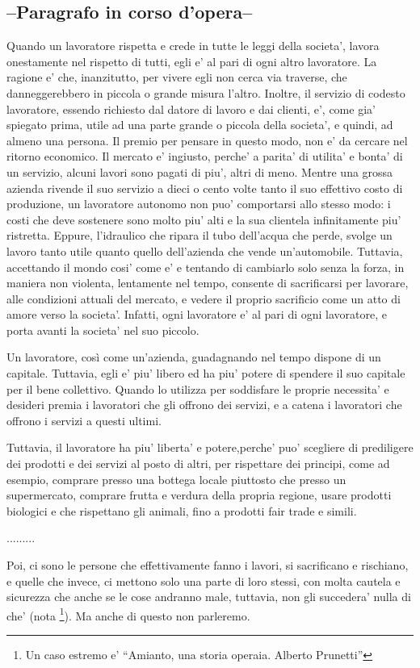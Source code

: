 \subsection{--Paragrafo in corso d'opera--}
Quando un lavoratore rispetta e crede in tutte le leggi della societa', lavora onestamente nel rispetto di tutti, egli e' al pari di ogni altro lavoratore. La ragione e' che, inanzitutto, per vivere egli non cerca via traverse, che danneggerebbero in piccola o grande misura l'altro. Inoltre, il servizio di codesto lavoratore, essendo richiesto dal datore di lavoro e dai clienti, e', come gia' spiegato prima, utile ad una parte grande o piccola della societa', e quindi, ad almeno una persona.
  Il premio per pensare in questo modo, non e' da cercare nel ritorno economico. Il mercato e' ingiusto, perche' a parita' di utilita' e bonta' di un servizio, alcuni lavori sono pagati di piu', altri di meno. Mentre una grossa azienda rivende il suo servizio a dieci o cento volte tanto il suo effettivo costo di produzione, un lavoratore autonomo non puo' comportarsi allo stesso modo: i costi che deve sostenere sono molto piu' alti e la sua clientela infinitamente piu' ristretta. Eppure, l'idraulico che ripara il tubo dell'acqua che perde, svolge un lavoro tanto utile quanto quello dell'azienda che vende un'automobile.
Tuttavia, accettando il mondo cosi' come e' e tentando di cambiarlo solo senza la forza, in maniera non violenta, lentamente nel tempo, consente di sacrificarsi per lavorare, alle condizioni attuali del mercato, e vedere il proprio sacrificio come un atto di amore verso la societa'. Infatti, ogni lavoratore e' al pari di ogni lavoratore, e porta avanti la societa' nel suo piccolo.

Un lavoratore, così come un'azienda, guadagnando nel tempo dispone di un capitale. Tuttavia, egli e' piu' libero ed ha piu' potere di spendere il suo capitale per il bene collettivo. Quando lo utilizza per soddisfare le proprie necessita' e desideri premia i lavoratori che gli offrono dei servizi, e a catena i lavoratori che offrono i servizi a questi ultimi.

Tuttavia, il lavoratore ha piu' liberta' e potere,perche' puo' scegliere di prediligere dei prodotti e dei servizi al posto di altri, per rispettare dei principi, come ad esempio, comprare presso una bottega locale piuttosto che presso un supermercato, comprare frutta e verdura della propria regione, usare prodotti biologici e che rispettano gli animali, fino a prodotti fair trade e simili.


.........


Poi, ci sono le persone che effettivamente fanno i lavori, si sacrificano e rischiano, e quelle che invece, ci mettono solo una parte di loro stessi, con molta cautela e sicurezza che anche se le cose andranno male, tuttavia, non gli succedera' nulla di che' (nota \footnote{Un caso estremo e' ``Amianto, una storia operaia. Alberto Prunetti''}). Ma anche di questo non parleremo.
